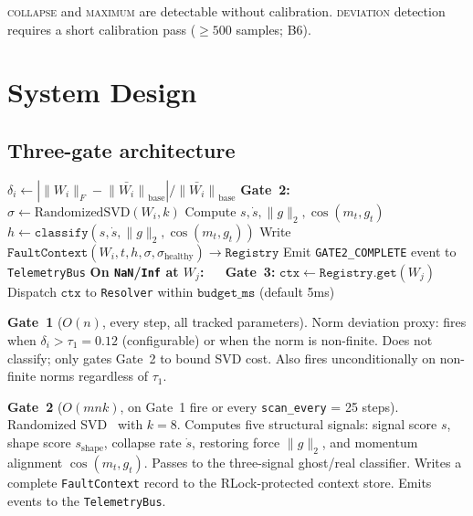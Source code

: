 \documentclass[11pt,a4paper]{article}
\theoremstyle{plain}
\begin{document}
\textsc{collapse} and \textsc{maximum} are detectable without calibration.
\textsc{deviation} detection requires a short calibration pass
($\geq 500$ samples; B6).


\section{System Design}
\label{sec:system}

\subsection{Three-gate architecture}
\label{sec:gates}

\begin{algorithm}[h]
\caption{NRI Three-Gate Monitoring Engine (\texttt{nonans} v0.4.0)}
\label{alg:gates}
\begin{algorithmic}[1]
    \State $\delta_i \gets |\|W_i\|_F - \bar{\|W_i\|}_\text{base}|
           / \bar{\|W_i\|}_\text{base}$
      \State \textbf{Gate~2:} $\sigma \gets \text{RandomizedSVD}(W_i, k)$
      \State Compute $s, \dot{s}, \|g\|_2, \cos(m_t, g_t)$
      \State $h \gets \texttt{classify}(s, \dot{s}, \|g\|_2, \cos(m_t, g_t))$
      \State Write $\texttt{FaultContext}(W_i, t, h, \sigma,
             \sigma_\text{healthy}) \to \texttt{Registry}$
      \State Emit \texttt{GATE2\_COMPLETE} event to \texttt{TelemetryBus}
    \EndIf
  \EndFor
\EndFor
\State \textbf{On \texttt{NaN}/\texttt{Inf} at $W_j$:}
\State $\quad$ \textbf{Gate~3:} $\texttt{ctx} \gets
  \texttt{Registry.get}(W_j)$ 
\State $\quad$ Dispatch $\texttt{ctx}$ to \texttt{Resolver} within
  $\texttt{budget\_ms}$ (default 5ms)
\end{algorithmic}
\end{algorithm}

\textbf{Gate~1} ($O(n)$, every step, all tracked parameters).
Norm deviation proxy: fires when $\delta_i > \tau_1 = 0.12$
(configurable) or when the norm is non-finite.
Does not classify; only gates Gate~2 to bound SVD cost.
Also fires unconditionally on non-finite norms regardless of $\tau_1$.

\textbf{Gate~2} ($O(mnk)$, on Gate~1 fire or every
\texttt{scan\_every} = 25 steps).
Randomized SVD~\citep{halko2011finding} with $k = 8$.
Computes five structural signals: signal score $s$,
shape score $s_\text{shape}$, collapse rate $\dot{s}$,
restoring force $\|g\|_2$, and momentum alignment $\cos(m_t, g_t)$.
Passes to the three-signal ghost/real classifier.
Writes a complete \texttt{FaultContext} record to the
RLock-protected context store.
Emits events to the \texttt{TelemetryBus}.
\end{document}
